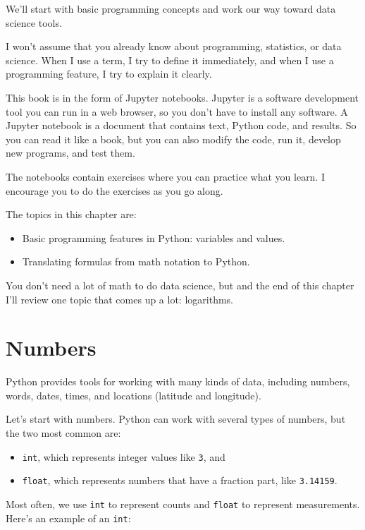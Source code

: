 We'll start with basic programming concepts and work our way toward data
science tools.

I won't assume that you already know about programming, statistics, or
data science. When I use a term, I try to define it immediately, and
when I use a programming feature, I try to explain it clearly.

This book is in the form of Jupyter notebooks. Jupyter is a software
development tool you can run in a web browser, so you don't have to
install any software. A Jupyter notebook is a document that contains
text, Python code, and results. So you can read it like a book, but you
can also modify the code, run it, develop new programs, and test them.

The notebooks contain exercises where you can practice what you learn. I
encourage you to do the exercises as you go along.

The topics in this chapter are:

\begin{itemize}
\item
  Basic programming features in Python: variables and values.
\item
  Translating formulas from math notation to Python.
\end{itemize}

You don't need a lot of math to do data science, but and the end of this
chapter I'll review one topic that comes up a lot: logarithms.

\hypertarget{numbers}{%
\section{Numbers}\label{numbers}}

Python provides tools for working with many kinds of data, including
numbers, words, dates, times, and locations (latitude and longitude).

Let's start with numbers. Python can work with several types of numbers,
but the two most common are:

\begin{itemize}
\item
  \passthrough{\lstinline!int!}, which represents integer values like
  \passthrough{\lstinline!3!}, and
\item
  \passthrough{\lstinline!float!}, which represents numbers that have a
  fraction part, like \passthrough{\lstinline!3.14159!}.
\end{itemize}

Most often, we use \passthrough{\lstinline!int!} to represent counts and
\passthrough{\lstinline!float!} to represent measurements. Here's an
example of an \passthrough{\lstinline!int!}:


